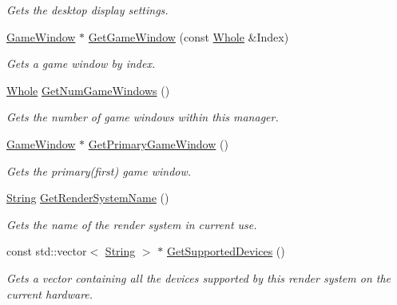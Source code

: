 \begin{DoxyCompactItemize}
\begin{DoxyCompactList}\small\item\em Gets the desktop display settings. \item\end{DoxyCompactList}\item 
\hyperlink{classphys_1_1GameWindow}{GameWindow} $\ast$ \hyperlink{classphys_1_1GraphicsManager_a94952747ba141966fb138101b10864ee}{GetGameWindow} (const \hyperlink{namespacephys_a460f6bc24c8dd347b05e0366ae34f34a}{Whole} \&Index)
\begin{DoxyCompactList}\small\item\em Gets a game window by index. \item\end{DoxyCompactList}\item 
\hyperlink{namespacephys_a460f6bc24c8dd347b05e0366ae34f34a}{Whole} \hyperlink{classphys_1_1GraphicsManager_ae54cf5861681ef6b1849b35bfaa55bb6}{GetNumGameWindows} ()
\begin{DoxyCompactList}\small\item\em Gets the number of game windows within this manager. \item\end{DoxyCompactList}\item 
\hyperlink{classphys_1_1GameWindow}{GameWindow} $\ast$ \hyperlink{classphys_1_1GraphicsManager_a4a0ef06c307c1521f60d39bd7a020643}{GetPrimaryGameWindow} ()
\begin{DoxyCompactList}\small\item\em Gets the primary(first) game window. \item\end{DoxyCompactList}\item 
\hyperlink{namespacephys_aa03900411993de7fbfec4789bc1d392e}{String} \hyperlink{classphys_1_1GraphicsManager_a9138c2f79ff9b711494089802724615e}{GetRenderSystemName} ()
\begin{DoxyCompactList}\small\item\em Gets the name of the render system in current use. \item\end{DoxyCompactList}\item 
const std::vector$<$ \hyperlink{namespacephys_aa03900411993de7fbfec4789bc1d392e}{String} $>$ $\ast$ \hyperlink{classphys_1_1GraphicsManager_a7d1cce1c63d5678266337323da1e8ff5}{GetSupportedDevices} ()
\begin{DoxyCompactList}\small\item\em Gets a vector containing all the devices supported by this render system on the current hardware. \item\end{DoxyCompactList}\item 

\end{DoxyCompactItemize}

